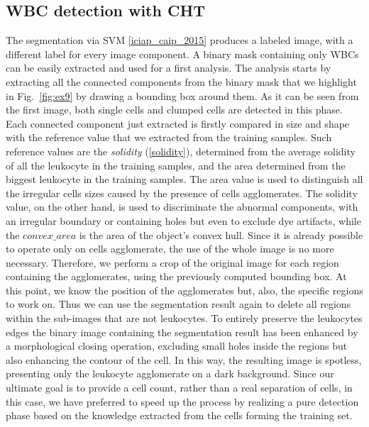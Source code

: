\documentclass[final,a4paper,12pt,english]{UnicaPhdThesis3}
\begin{document}
{\subsection{WBC detection with CHT}
The segmentation via SVM \ref{iciap_caip_2015} produces a labeled image, with a different label for every image component. A binary mask containing only WBCs can be easily extracted and used for a first analysis. The analysis starts by extracting all the connected components from the binary mask that we highlight in Fig.~\ref{fig:ex9} by drawing a bounding box around them. As it can be seen from the first image, both single cells and clumped cells are detected in this phase.
Each connected component just extracted is firstly compared in size and shape with the reference value that we extracted from the training samples. Such reference values are the \textit{solidity} (\ref{solidity}), determined from the average solidity of all the leukocyte in the training samples, and the area determined from the biggest leukocyte in the training samples. The area value is used to distinguish all the irregular cells sizes caused by the presence of cells agglomerates. The solidity value, on the other hand, is used to discriminate the abnormal components, with an irregular boundary or containing holes but even to exclude dye artifacts, while the $convex\_area$ is the area of the object's convex hull. Since it is already possible to operate only on cells agglomerate, the use of the whole image is no more necessary. Therefore, we perform a crop of the original image for each region containing the agglomerates, using the previously computed bounding box. At this point, we know the position of the agglomerates but, also, the specific regions to work on. Thus we can use the segmentation result again to delete all regions within the sub-images that are not leukocytes. 
To entirely preserve the leukocytes edges the binary image containing the segmentation result has been enhanced by a morphological closing operation, excluding small holes inside the regions but also enhancing the contour of the cell. In this way, the resulting image is spotless, presenting only the leukocyte agglomerate on a dark background. Since our ultimate goal is to provide a cell count, rather than a real separation of cells, in this case, we have preferred to speed up the process by realizing a pure detection phase based on the knowledge extracted from the cells forming the training set. 
}
\end{document}
